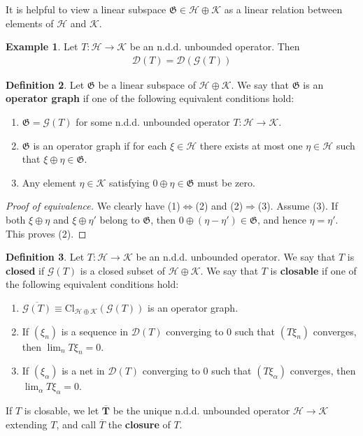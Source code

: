 \documentclass[12pt,b5paper,notitlepage]{article}
\theoremstyle{definition}
\newtheorem{df}{Definition}[subsection]
\newtheorem{eg}[df]{Example}
\theoremstyle{plain}
\newcommand{\fk}{\mathfrak}
\newcommand{\ovl}{\overline}
\newcommand{\Dom}{\mathscr{D}}
\newcommand{\Cl}{\mathrm{Cl}}
\newcommand{\MH}{\mathcal H}
\newcommand{\MK}{\mathcal K}
\newcommand{\SG}{\mathscr G}
\newcommand{\hqed}{\hfill\qedsymbol}
\numberwithin{equation}{section}
\begin{document}
It is helpful to view a linear subspace $\fk G\in\MH\oplus\MK$ as a linear relation between elements of $\MH$ and $\MK$.


\begin{eg}
Let $T:\MH\rightarrow\MK$ be an n.d.d. unbounded operator. Then
\begin{align*}
\Dom(T)=\Dom(\SG(T))
\end{align*}
\end{eg}


\begin{df}\label{lb387}
Let $\fk G$ be a linear subspace of $\MH\oplus\MK$. We say that $\fk G$ is an \textbf{operator graph}  if one of the following equivalent conditions hold:
\begin{enumerate}[label=(\arabic*)]
\item $\fk G=\SG(T)$ for some n.d.d. unbounded operator $T:\MH\rightarrow\MK$.
\item $\fk G$ is an operator graph if for each $\xi\in\MH$ there exists at most one $\eta\in\MH$ such that $\xi\oplus\eta\in\fk G$.
\item Any element $\eta\in\MK$ satisfying $0\oplus\eta\in\fk G$ must be zero.
\end{enumerate} 
\end{df}

\begin{proof}[Proof of equivalence]
We clearly have (1)$\Leftrightarrow$(2) and (2)$\Rightarrow$(3). Assume (3). If both $\xi\oplus\eta$ and $\xi\oplus\eta'$ belong to $\fk G$, then $0\oplus(\eta-\eta')\in\fk G$, and hence $\eta=\eta'$. This proves (2).
\end{proof}




\begin{df}
Let $T:\MH\rightarrow\MK$ be an n.d.d. unbounded operator. We say that $T$ is \textbf{closed} if $\SG(T)$ is a closed subset of $\MH\oplus\MK$.  We say that $T$ is \textbf{closable} if one of the following equivalent conditions hold:
\begin{enumerate}[label=(\arabic*)]
\item $\ovl{\SG(T)}\equiv\Cl_{\MH\oplus\MK}(\SG(T))$ is an operator graph.
\item If $(\xi_n)$ is a sequence in $\Dom(T)$ converging to $0$ such that $(T\xi_n)$ converges, then $\lim_n T\xi_n=0$.
\item If $(\xi_\alpha)$ is a net in $\Dom(T)$ converging to $0$ such that $(T\xi_\alpha)$ converges, then $\lim_\alpha T\xi_\alpha=0$.
\end{enumerate}  

If $T$ is closable, we let $\pmb{\ovl T}$ be the unique n.d.d. unbounded operator $\MH\rightarrow\MK$ extending $T$, and call $\ovl T$ the \textbf{closure} of $T$.   \hqed
\end{df}
\end{document}
